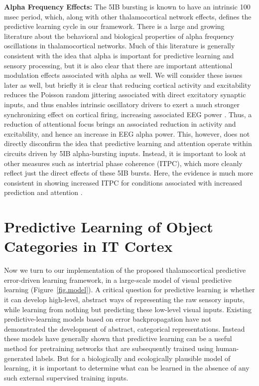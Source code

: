 \documentclass[11pt,twoside]{article}
\newif\myifpdf
\begin{document}
{\bf Alpha Frequency Effects:} The 5IB bursting is known to have an intrinsic 100 msec period, which, along with other thalamocortical network effects, defines the predictive learning cycle in our framework.  There is a large and growing literature about the behavioral and biological properties of alpha frequency oscillations in thalamocortical networks.  Much of this literature is generally consistent with the idea that alpha is important for predictive learning and sensory processing, but it is also clear that there are important attentional modulation effects associated with alpha as well.  We will consider these issues later as well, but briefly it is clear that reducing cortical activity and excitability reduces the Poisson random jittering associated with direct excitatory synaptic inputs, and thus enables intrinsic oscillatory drivers to exert a much stronger synchronizing effect on cortical firing, increasing associated EEG power \cite{ZhouSchaferDesimone16,KlimeschSausengHanslmayr07,JensenMazaheri10}.  Thus, a reduction of attentional focus brings an associated reduction in activity and excitability, and hence an increase in EEG alpha power.  This, however, does not directly disconfirm the idea that predictive learning and attention operate within circuits driven by 5IB alpha-bursting inputs.  Instead, it is important to look at other measures such as intertrial phase coherence (ITPC), which more cleanly reflect just the direct effects of these 5IB bursts.  Here, the evidence is much more consistent in showing increased ITPC for conditions associated with increased prediction and attention \cite{papers}.

\section{Predictive Learning of Object Categories in IT Cortex}

Now we turn to our implementation of the proposed thalamocortical predictive error-driven learning framework, in a large-scale model of visual predictive learning (Figure~\ref{fig.model}).  A critical question for predictive learning is whether it can develop high-level, abstract ways of representing the raw sensory inputs, while learning from nothing but predicting these low-level visual inputs.  Existing predictive-learning models based on error backpropagation \cite{LotterKreimanCox16,JakeAddOthers} have not demonstrated the development of abstract, categorical representations.  Instead these models have generally shown that predictive learning can be a useful method for pretraining networks that are subsequently trained using human-generated labels.  But for a biologically and ecologically plausible model of learning, it is important to determine what can be learned in the absence of any such external supervised training inputs.
\end{document}
